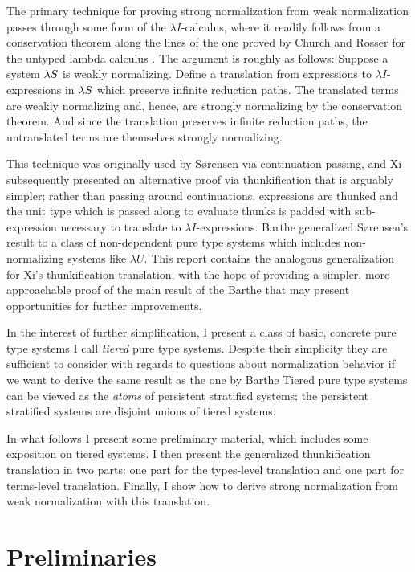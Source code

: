 \documentclass{article}
\begin{document}
The primary technique for proving strong normalization from weak normalization passes through some form of the $\lambda I$-calculus, where it readily follows from a conservation theorem along the lines of the one proved by Church and Rosser for the untyped lambda calculus \cite{church-rosser-1936}.
The argument is roughly as follows:
Suppose a system $\lambda S$ is weakly normalizing.
Define a translation from expressions to $\lambda I$-expressions in $\lambda S$ which preserve infinite reduction paths.
The translated terms are weakly normalizing and, hence, are strongly normalizing by the conservation theorem.
And since the translation preserves infinite reduction paths, the untranslated terms are themselves strongly normalizing.

This technique was originally used by S{\o}rensen \cite{sorensen-1997} via continuation-passing, and Xi \cite{xi-1997} subsequently presented an alternative proof via thunkification that is arguably simpler; rather than passing around continuations, expressions are thunked and the unit type which is passed along to evaluate thunks is padded with sub-expression necessary to translate to $\lambda I$-expressions.
Barthe \etal \cite{barthe-et-al-2001} generalized S{\o}rensen's result to a class of non-dependent pure type systems which includes non-normalizing systems like $\lambda U$.
This report contains the analogous generalization for Xi's thunkification translation, with the hope of providing a simpler, more approachable proof of the main result of the Barthe \etal that may present opportunities for further improvements.

In the interest of further simplification, I present a class of basic, concrete pure type systems I call \textit{tiered} pure type systems.
Despite their simplicity they are sufficient to consider with regards to questions about normalization behavior if we want to derive the same result as the one by Barthe \etal
Tiered pure type systems can be viewed as the \textit{atoms} of persistent stratified systems; the persistent stratified systems are disjoint unions of tiered systems.

In what follows I present some preliminary material, which includes some exposition on tiered systems.
I then present the generalized thunkification translation in two parts: one part for the types-level translation and one part for terms-level translation.
Finally, I show how to derive strong normalization from weak normalization with this translation.

\section{Preliminaries}
\end{document}
